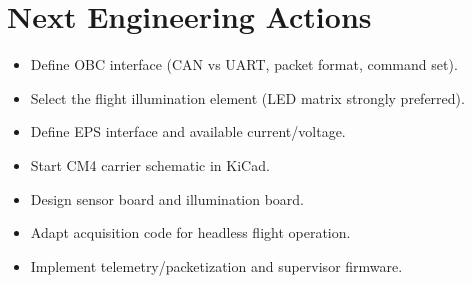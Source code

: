 \section{Next Engineering Actions}

\begin{itemize}[leftmargin=1.5em]
    \item Define OBC interface (CAN vs UART, packet format, command set).
    \item Select the flight illumination element (LED matrix strongly preferred).
    \item Define EPS interface and available current/voltage.
    \item Start CM4 carrier schematic in KiCad.
    \item Design sensor board and illumination board.
    \item Adapt acquisition code for headless flight operation.
    \item Implement telemetry/packetization and supervisor firmware.
\end{itemize}
